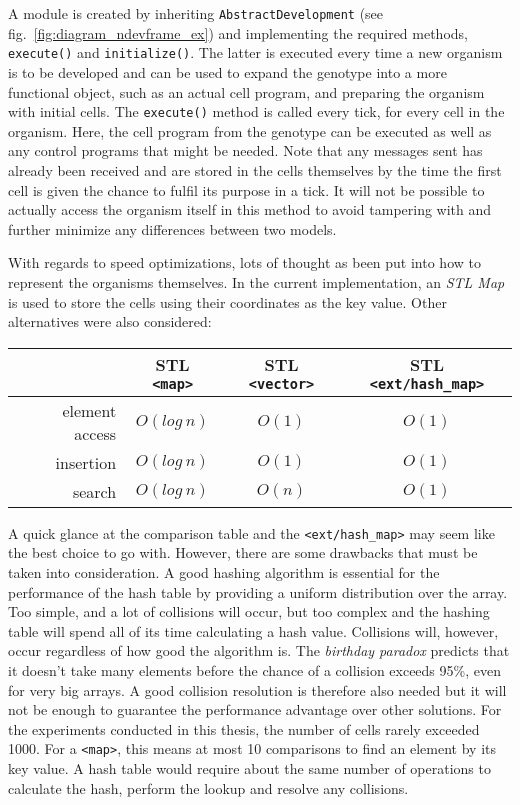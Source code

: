 A module is created by inheriting \texttt{AbstractDevelopment} (see fig.~\ref{fig:diagram_ndevframe_ex}) and implementing the required methods, \texttt{execute()} and \texttt{initialize()}. The latter is executed every time a new organism is to be developed and can be used to expand the genotype into a more functional object, such as an actual cell program, and preparing the organism with initial cells. The \texttt{execute()} method is called every tick, for every cell in the organism. Here, the cell program from the genotype can be executed as well as any control programs that might be needed. Note that any messages sent has already been received and are stored in the cells themselves by the time the first cell is given the chance to fulfil its purpose in a tick. It will not be possible to actually access the organism itself in this method to avoid tampering with and further minimize any differences between two models.

With regards to speed optimizations, lots of thought as been put into how to represent the organisms themselves. In the current implementation, an \emph{STL Map} is used to store the cells using their coordinates as the key value. Other alternatives were also considered:

\begin{center}
	\begin{tabular}{ r | c | c | c }
		~ & STL \texttt{<map>} & STL \texttt{<vector>} & STL \texttt{<ext/hash\_map>} \\
		\hline
		element access & $O(log~n)$ & $O(1)$ & $O(1)$ \\
		\hline
		insertion & $O(log~n)$ & $O(1)$ & $O(1)$ \\
		\hline
		search & $O(log~n)$ & $O(n)$ & $O(1)$ \\
	\end{tabular}
\end{center}

A quick glance at the comparison table and the \texttt{<ext/hash\_map>} may seem like the best choice to go with. However, there are some drawbacks that must be taken into consideration. A good hashing algorithm is essential for the performance of the hash table by providing a uniform distribution over the array. Too simple, and a lot of collisions will occur, but too complex and the hashing table will spend all of its time calculating a hash value. Collisions will, however, occur regardless of how good the algorithm is. The \emph{birthday paradox} predicts that it doesn't take many elements before the chance of a collision exceeds 95\%, even for very big arrays. A good collision resolution is therefore also needed but it will not be enough to guarantee the performance advantage over other solutions. For the experiments conducted in this thesis, the number of cells rarely exceeded 1000. For a \texttt{<map>}, this means at most 10 comparisons to find an element by its key value. A hash table would require about the same number of operations to calculate the hash, perform the lookup and resolve any collisions.

